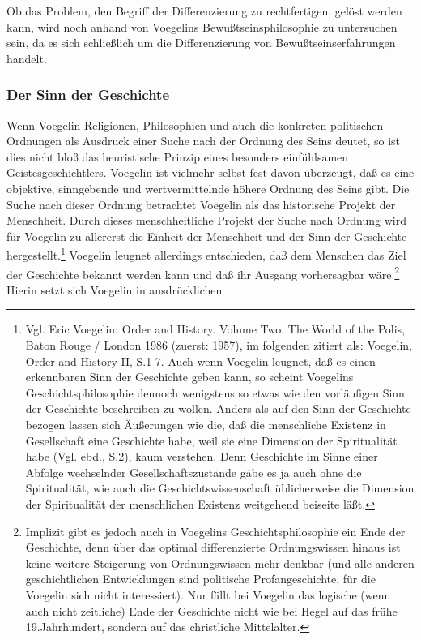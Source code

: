 Ob das Problem, den Begriff der Differenzierung zu rechtfertigen, gelöst
werden kann, wird noch anhand von Voegelins Bewußtseinsphilosophie zu
untersuchen sein, da es sich schließlich um die Differenzierung von
Bewußtseinserfahrungen handelt.

\subsubsection{Der Sinn der Geschichte}

Wenn Voegelin Religionen, Philosophien und auch die konkreten politischen
Ordnungen als Ausdruck einer Suche nach der Ordnung des Seins deutet, so ist
dies nicht bloß das heuristische Prinzip eines besonders einfühlsamen
Geistesgeschichtlers. Voegelin ist vielmehr selbst fest davon überzeugt, daß
es eine objektive, sinngebende und wertvermittelnde höhere Ordnung des Seins
gibt. Die Suche nach dieser Ordnung betrachtet Voegelin als das historische
Projekt der Menschheit. Durch dieses menschheitliche Projekt der Suche nach
Ordnung wird für Voegelin zu allererst die Einheit der Menschheit und der Sinn
der Geschichte hergestellt.\footnote{Vgl. Eric Voegelin: Order and History.
  Volume Two. The World of the Polis, Baton Rouge / London 1986 (zuerst:
  1957), im folgenden zitiert als: Voegelin, Order and History II, S.1-7. Auch
  wenn Voegelin leugnet, daß es einen erkennbaren Sinn der Geschichte geben
  kann, so scheint Voegelins Geschichtsphilosophie dennoch wenigstens so etwas
  wie den vorläufigen Sinn der Geschichte beschreiben zu wollen. Anders als
  auf den Sinn der Geschichte bezogen lassen sich Äußerungen wie die, daß die
  menschliche Existenz in Gesellschaft eine Geschichte habe, weil sie eine
  Dimension der Spiritualität habe (Vgl. ebd., S.2), kaum verstehen. Denn
  Geschichte im Sinne einer Abfolge wechselnder Gesellschaftszustände gäbe es
  ja auch ohne die Spiritualität, wie auch die Geschichtswissenschaft
  üblicherweise die Dimension der Spiritualität der menschlichen Existenz
  weitgehend beiseite läßt.}  Voegelin leugnet allerdings entschieden, daß dem
Menschen das Ziel der Geschichte bekannt werden kann und daß ihr Ausgang
vorhersagbar wäre.\footnote{Implizit gibt es jedoch auch in Voegelins
  Geschichtsphilosophie ein Ende der Geschichte, denn über das optimal
  differenzierte Ordnungswissen hinaus ist keine weitere Steigerung von
  Ordnungswissen mehr denkbar (und alle anderen geschichtlichen Entwicklungen
  sind politische Profangeschichte, für die Voegelin sich nicht interessiert).
  Nur fällt bei Voegelin das logische (wenn auch nicht zeitliche) Ende der
  Geschichte nicht wie bei Hegel auf das frühe 19.Jahrhundert, sondern auf das
  christliche Mittelalter.} Hierin setzt sich Voegelin in ausdrücklichen
